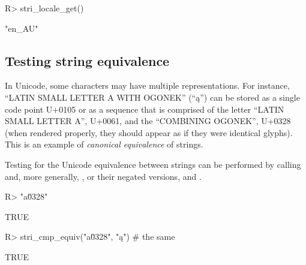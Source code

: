 \documentclass[nojss]{jss}\usepackage[]{graphicx}\usepackage[]{color}
\begin{document}
\begin{Schunk}
\begin{Sinput}
R> stri_locale_get()
\end{Sinput}
\begin{Soutput}
[1] "en_AU"
\end{Soutput}
\end{Schunk}


%
%
%
%
%







\subsection{Testing string equivalence}\label{Sec:Equivalence}



In Unicode, some characters may have multiple representations.
For instance, ``LATIN SMALL LETTER A WITH OGONEK'' (``ą'') can be stored
as a single code point U+0105 or as a sequence
that is comprised of the letter ``LATIN SMALL LETTER A'', U+0061, and
the ``{COMBINING OGONEK}'', U+0328 (when rendered properly, they
should appear as if they were identical glyphs).
This is an example of \textit{canonical equivalence} of strings.

Testing for the Unicode equivalence between strings
can be performed by calling  and, more generally,
, or their negated versions,
 and .

\begin{Schunk}
\begin{Sinput}
R> "a\u0328" %s==% "ą"             # a, ogonek == a with ogonek
\end{Sinput}
\begin{Soutput}
[1] TRUE
\end{Soutput}
\begin{Sinput}
R> stri_cmp_equiv("a\u0328", "ą")  # the same
\end{Sinput}
\begin{Soutput}
[1] TRUE
\end{Soutput}
\end{Schunk}
\end{document}
